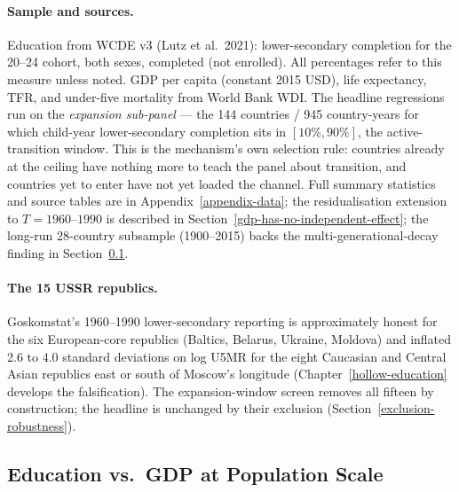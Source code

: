 \documentclass[12pt,letterpaper]{article}
\begin{document}
\paragraph{Sample and sources.}
Education from WCDE v3 (Lutz et al.~2021): lower-secondary completion
for the 20--24 cohort, both sexes, completed (not enrolled). All
percentages refer to this measure unless noted. GDP per capita
(constant 2015 USD), life expectancy, TFR, and under-five mortality
from World Bank WDI. The headline regressions run on the
\emph{expansion sub-panel} --- the 144 countries / 945
country-years for which child-year lower-secondary completion sits
in $[10\%, 90\%]$, the active-transition window. This is the
mechanism's own selection rule: countries already at the ceiling
have nothing more to teach the panel about transition, and countries
yet to enter have not yet loaded the channel.
Full summary statistics and source tables are in
Appendix~\ref{appendix-data}; the residualisation extension to
$T=1960$--$1990$ is described in
Section~\ref{gdp-has-no-independent-effect}; the long-run
28-country subsample (1900--2015) backs the
multi-generational-decay finding in
Section~\ref{education-vs-gdp-as-predictors-of-attainment}.

\paragraph{The 15 USSR republics.}
Goskomstat's 1960--1990 lower-secondary reporting is approximately
honest for the six European-core republics (Baltics, Belarus, Ukraine,
Moldova) and inflated 2.6 to 4.0 standard deviations on log U5MR for
the eight Caucasian and Central Asian republics east or south of
Moscow's longitude (Chapter~\ref{hollow-education} develops the
falsification). The expansion-window screen removes all fifteen by
construction; the headline is unchanged by their exclusion
(Section~\ref{exclusion-robustness}).

\subsection{Education vs.\ GDP at Population Scale}\label{education-vs-gdp-as-predictors-of-attainment}
\label{gdp-has-no-independent-effect}
\label{completion-as-the-operative-variable}
\end{document}
